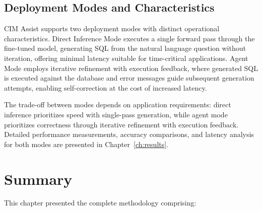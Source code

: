 \subsection{Deployment Modes and Characteristics}

CIM Assist supports two deployment modes with distinct operational characteristics. Direct Inference Mode executes a single forward pass through the fine-tuned model, generating SQL from the natural language question without iteration, offering minimal latency suitable for time-critical applications. Agent Mode employs iterative refinement with execution feedback, where generated SQL is executed against the database and error messages guide subsequent generation attempts, enabling self-correction at the cost of increased latency.

The trade-off between modes depends on application requirements: direct inference prioritizes speed with single-pass generation, while agent mode prioritizes correctness through iterative refinement with execution feedback. Detailed performance measurements, accuracy comparisons, and latency analysis for both modes are presented in Chapter~\ref{ch:results}.

\section{Summary}

This chapter presented the complete methodology comprising:

